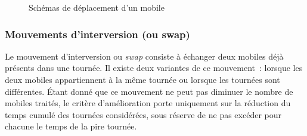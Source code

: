 			\begin{code}
				\begin{algo}[informal]
					\BEGIN
									\ENDFORGEN
								\ENDFORGEN
							\ENDFORGEN
						\ENDFORGEN
					\END
				\end{algo}
			\end{code}

			\begin{figure}[h!]
			\begin{subfigure}[b]{.54\linewidth}
				\centering
				\begin{tikzpicture}[schema]
					
				\end{tikzpicture}
				\label{subfig:move_move1route}
			\end{subfigure}
			\hfill
			\begin{subfigure}[b]{.45\linewidth}
				\centering
				\begin{tikzpicture}[schema]
					
				\end{tikzpicture}
				\label{subfig:move_move2routes}
			\end{subfigure}
			\caption{Schémas de déplacement d'un mobile}
			\label{fig:move_move}
			\end{figure}

		\subsubsection{Mouvements d'interversion (ou swap)}
			Le mouvement d'interversion ou \emph{swap} consiste à échanger deux mobiles déjà présents dans une tournée. Il existe deux variantes de ce mouvement : lorsque les deux mobiles appartiennent à la même tournée ou lorsque les tournées sont différentes. Étant donné que ce mouvement ne peut pas diminuer le nombre de mobiles traités, le critère d'amélioration porte uniquement sur la réduction du temps cumulé des tournées considérées, sous réserve de ne pas excéder pour chacune le temps de la pire tournée.

